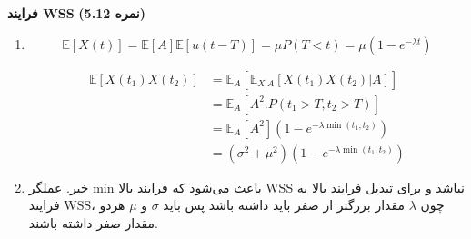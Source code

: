 \Large \textbf{فرایند WSS}
\large \textbf{(5.12 نمره)}

\normalsize \vspace{0.5cm}

\begin{enumerate}
	\item
	
	$$
	\mathbb{E}\left[ {X\left( t \right)} \right] = \mathbb{E}\left[ A \right]\mathbb{E}\left[ {u\left( {t - T} \right)} \right] = \mu P\left( {T < t} \right) = \mu \left( {1 - {e^{ - \lambda t}}} \right)
	$$
	
	$$
	\begin{aligned}
		\mathbb{E}\left[ {X\left( {{t_1}} \right)X\left( {{t_2}} \right)} \right] & = {\mathbb{E}_A}\left[ {{\mathbb{E}_{X|A}}\left[ {X\left( {{t_1}} \right)X\left( {{t_2}} \right)|A} \right]} \right]\\
		& = {\mathbb{E}_A}\left[ {{A^2}.P\left( {{t_1} > T,{t_2} > T} \right)} \right]\\
		& = {\mathbb{E}_A}\left[ {{A^2}} \right]\left( {1 - {e^{ - \lambda \min ({t_1},{t_2})}}} \right)\\
		& = \left( {{\sigma ^2} + {\mu ^2}} \right)\left( {1 - {e^{ - \lambda \min ({t_1},{t_2})}}} \right)
	\end{aligned}
	$$
	
	\item
	
	خیر. عملگر min باعث می‌شود که فرایند بالا WSS نباشد و برای تبدیل فرایند بالا به فرایند WSS،‌ چون
	$\lambda$
	مقدار بزرگتر از صفر باید داشته باشد پس باید
	$\sigma$
	و
	$\mu$
	هردو مقدار صفر داشته باشند.
	
	
\end{enumerate}